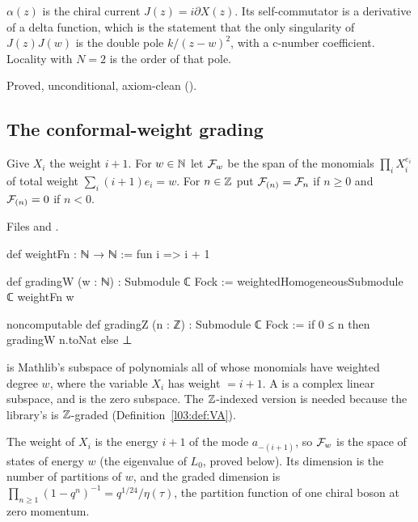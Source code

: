 \begin{physics}
$\alpha(z)$ is the chiral current $J(z)=i\partial X(z)$. Its self-commutator is a derivative of a delta
function, which is the statement that the only singularity of $J(z)J(w)$ is the double pole
$k/(z-w)^2$, with a c-number coefficient. Locality with $N=2$ is the order of that pole.
\end{physics}

\begin{status}
Proved, unconditional, axiom-clean ().
\end{status}

\subsection{The conformal-weight grading}

\begin{definition}\label{l05:def:gradingW}
Give $X_i$ the weight $i+1$. For $w\in{\mathbb{N}}$ let $\mathcal{F}_w$ be the span of the monomials
$\prod_iX_i^{e_i}$ of total weight $\sum_i(i+1)e_i=w$. For $n\in{\mathbb{Z}}$ put $\mathcal{F}_{(n)}=\mathcal{F}_n$ if $n\ge0$ and
$\mathcal{F}_{(n)}=0$ if $n<0$.
\end{definition}

\noindent Files  and
.
\begin{leancode}
def weightFn : ℕ → ℕ := fun i => i + 1

def gradingW (w : ℕ) : Submodule ℂ Fock :=
  weightedHomogeneousSubmodule ℂ weightFn w

noncomputable def gradingZ (n : ℤ) : Submodule ℂ Fock :=
  if 0 ≤ n then gradingW n.toNat else ⊥
\end{leancode}

\begin{dictionary}
 is Mathlib's subspace of polynomials all of whose
monomials have weighted degree $w$, where the variable $X_i$ has weight  $=i+1$. A
 is a complex linear subspace, and  is the zero subspace. The ${\mathbb{Z}}$-indexed
version is needed because the library's  is ${\mathbb{Z}}$-graded
(Definition~\ref{l03:def:VA}).
\end{dictionary}

\begin{physics}
The weight of $X_i$ is the energy $i+1$ of the mode $a_{-(i+1)}$, so $\mathcal{F}_w$ is the space of states of
energy $w$ (the eigenvalue of $L_0$, proved below). Its dimension is the number of partitions of $w$, and the
graded dimension is $\prod_{n\ge1}(1-q^n)^{-1}=q^{1/24}/\eta(\tau)$, the partition function of one chiral boson
at zero momentum.
\end{physics}

